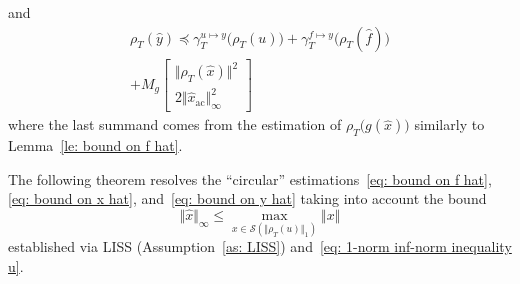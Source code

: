 \documentclass[letterpaper, 10 pt, conference]{ieeeconf}
\newcommand{\ac}{_\mathrm{ac}}
\newcommand{\guy}{\gamma^{u \mapsto y}}
\newcommand{\gfy}{\gamma^{f \mapsto y}}
\newcommand{\pb}[1]{\big( #1 \big)}
\newcommand{\norm}[1]{\Vert #1 \Vert}
\newcommand{\calS}{\mathcal{S}}
\begin{document}
and
\begin{multline}
    \label{eq: bound on y hat}
    \rho_T(\hat y) \preceq \guy_T\pb{\rho_T(u)}
    + \gfy_T\pb{\rho_T(\hat f)} \\
    + M_g \begin{bmatrix}
        \norm{\rho_T(\hat x)}^2 \\
        2\norm{\hat x\ac}_\infty^2
    \end{bmatrix}
\end{multline}
where the last summand comes from the estimation of $\rho_T\pb{g(\hat x)}$ similarly to Lemma~\ref{le: bound on f hat}.

The following theorem resolves the ``circular'' estimations~\eqref{eq: bound on f hat}, \eqref{eq: bound on x hat}, and~\eqref{eq: bound on y hat} taking into account the bound
\begin{equation}
    \label{eq: a priori bound x hat}
    \norm{\hat x}_\infty \leq \max_{x \in \calS(\norm{\rho_T(u)}_1)} \norm{x}
\end{equation}
established via LISS (Assumption~\ref{as: LISS}) and~\eqref{eq: 1-norm inf-norm inequality u}.
\end{document}
